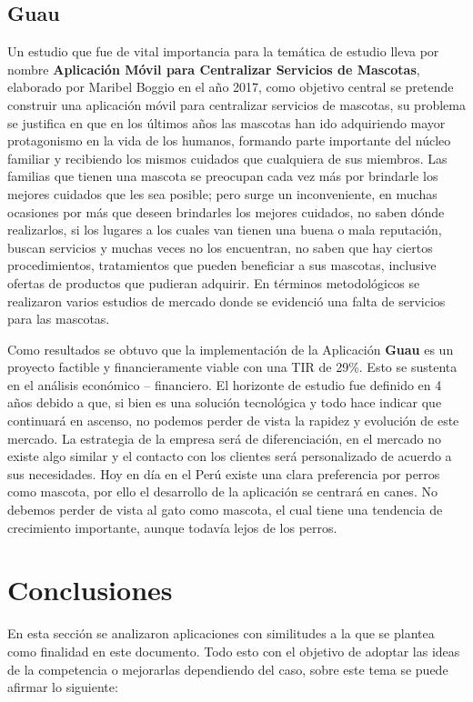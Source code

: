 \subsection{Guau}
Un estudio que fue de vital importancia para la temática de estudio lleva por nombre \textbf{Aplicación Móvil para Centralizar Servicios de Mascotas}, elaborado por Maribel Boggio en el año 2017, como objetivo central se pretende construir una aplicación móvil para centralizar servicios de mascotas, su problema se justifica en que en los últimos años las mascotas han ido adquiriendo mayor protagonismo en la vida de los humanos, formando parte importante del núcleo familiar y recibiendo los mismos cuidados que cualquiera de sus miembros. Las familias que tienen una mascota se preocupan cada vez más por brindarle los mejores cuidados que les sea posible; pero surge un inconveniente, en muchas ocasiones por más que deseen brindarles los mejores cuidados, no saben dónde realizarlos, si los lugares a los cuales van tienen una buena o mala reputación, buscan servicios y muchas veces no los encuentran, no saben que hay ciertos procedimientos, tratamientos que pueden beneficiar a sus mascotas, inclusive ofertas de productos que pudieran adquirir. En términos metodológicos se realizaron varios estudios de mercado donde se evidenció una falta de servicios para las mascotas. 

Como resultados se obtuvo que la implementación de la Aplicación \textbf{Guau} es un proyecto factible y financieramente viable con una TIR de 29\%. Esto se sustenta en el análisis económico – financiero. El horizonte de estudio fue definido en 4 años debido a que, si bien es una solución tecnológica y todo hace indicar que continuará en ascenso, no podemos perder de vista la rapidez y evolución de este mercado. La estrategia de la empresa será de diferenciación, en el mercado no existe algo similar y el contacto con los clientes será personalizado de acuerdo a sus necesidades. Hoy en día en el Perú existe una clara preferencia por perros como mascota, por ello el desarrollo de la aplicación se centrará en canes. No debemos perder de vista al gato como mascota, el cual tiene una tendencia de crecimiento importante, aunque todavía lejos de los perros. 

\section{Conclusiones}\label{chapter:introduction}

En esta sección se analizaron aplicaciones con similitudes a la que se plantea como finalidad en este documento. Todo esto con el objetivo de adoptar las ideas de la competencia o mejorarlas dependiendo del caso, sobre este tema se puede afirmar lo siguiente:

